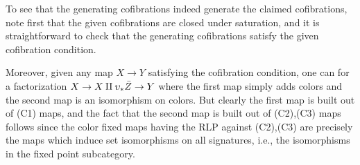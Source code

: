 \documentclass[a4paper,10pt
]{article}%
\renewcommand{\1}{\eta}%
\begin{document}
\begin{remark}
To see that the generating cofibrations indeed generate the claimed cofibrations, note first that the given cofibrations are closed under saturation, 
and it is straightforward to check that the generating cofibrations satisfy the given cofibration condition.

Moreover, given any map $X \to Y$ satisfying the cofibration condition,
one can for a factorization
$X \to X \amalg \upsilon_{\**}\bar{Z} \to Y$
where the first map simply adds colors and the second map is an isomorphism on colors.
But clearly the first map is built out of (C1) maps, and the fact that the second map is built out of (C2),(C3) maps follows since the color fixed maps having the RLP against (C2),(C3) are precisely the maps which induce set isomorphisms on all signatures, i.e., the isomorphisms in the fixed point subcategory.
\end{remark}








{}

\end{document}
